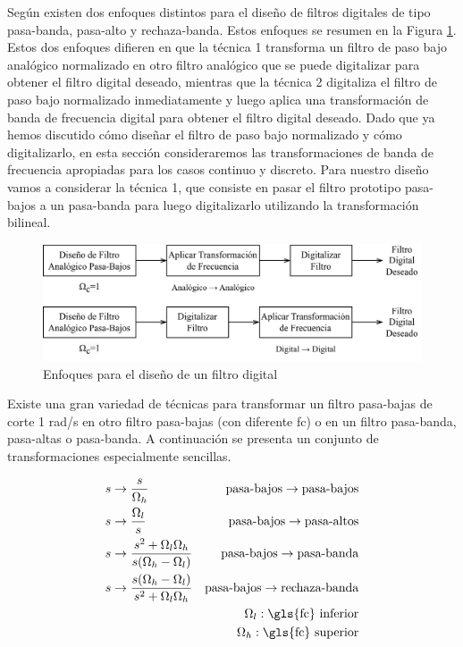 Según \cite{rabiner1995theory} existen dos enfoques distintos para el diseño de filtros digitales de tipo pasa-banda, pasa-alto y rechaza-banda. Estos enfoques se resumen en la Figura \ref{fig:enfoques_diseno}. Estos dos enfoques difieren en que la técnica 1 transforma un filtro de paso bajo analógico normalizado en otro filtro analógico que se puede digitalizar para obtener el filtro digital deseado, mientras que la técnica 2 digitaliza el filtro de paso bajo normalizado inmediatamente y luego aplica una transformación de banda de frecuencia digital para obtener el filtro digital deseado. Dado que ya hemos discutido cómo diseñar el filtro de paso bajo normalizado y cómo digitalizarlo, en esta sección consideraremos las transformaciones de banda de frecuencia apropiadas para los casos continuo y discreto. Para nuestro diseño vamos a considerar la técnica 1, que consiste en pasar el filtro prototipo pasa-bajos a un pasa-banda para luego digitalizarlo utilizando la transformación bilineal.

\begin{figure}[H]
  \centering
  \includegraphics[width=\linewidth]{images/diagramas-enfoques-diseno.drawio.png}
  \caption{Enfoques para el diseño de un filtro digital}
  \label{fig:enfoques_diseno}
\end{figure}

Existe una gran variedad de técnicas para transformar un filtro pasa-bajas de corte 1 rad/s en otro filtro pasa-bajas (con diferente \gls{fc}) o en un filtro pasa-banda, pasa-altas o pasa-banda. A continuación se presenta un conjunto de transformaciones especialmente sencillas.

\begin{align}
  s & \rightarrow \frac{s}{\Omega_h}                                     & \textrm{pasa-bajos} \rightarrow \textrm{pasa-bajos}                           \\
  s & \rightarrow \frac{\Omega_l}{s}                                     & \textrm{pasa-bajos} \rightarrow \textrm{pasa-altos}                           \\
  s & \rightarrow \frac{s^2 + \Omega_l \Omega_h}{s(\Omega_h - \Omega_l)} & \textrm{pasa-bajos} \rightarrow \textrm{pasa-banda} \label{eq:transf_frec_pb} \\
  s & \rightarrow \frac{s(\Omega_h - \Omega_l)}{s^2 + \Omega_l \Omega_h} & \textrm{pasa-bajos} \rightarrow \textrm{rechaza-banda}                        \\
    &                                                                    & \Omega_l : \textrm{\gls{fc} inferior} \notag                                  \\
    &                                                                    & \Omega_h : \textrm{\gls{fc} superior} \notag
\end{align}

